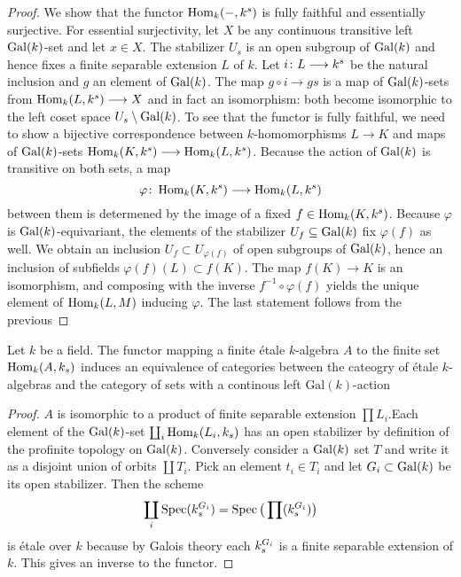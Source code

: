 \begin{proof}
	We show that the functor $\operatorname{Hom}_k(-,k^s)$ is fully faithful and essentially surjective. For essential surjectivity, let $X$ be any continuous transitive left $\operatorname{Gal}(k)$-set and let $x \in X$. The stabilizer $U_s$ is an open subgroup of $\operatorname{Gal}(k)$ and hence fixes a finite separable extension $L$ of $k$. Let $i \colon L \longrightarrow k^s$ be the natural inclusion and $g$ an element of $\operatorname{Gal}(k)$. The map $g \circ i \to gs$ is a map of $\operatorname{Gal}(k)$-sets from $\operatorname{Hom}_k(L,k^s) \longrightarrow X$ and in fact an isomorphism: both become isomorphic to the left coset space $U_s\setminus \operatorname{Gal}(k)$.
	To see that the functor is fully faithful, we need to show a bijective correspondence between $k$-homomorphisms $L \to K$ and maps of $\operatorname{Gal}(k)$-sets $\operatorname{Hom}_k(K, k^s) \longrightarrow \operatorname{Hom}_k(L, k^s)$. Because the action of $\operatorname{Gal}(k)$ is transitive on both sets, a map
	\[
		\varphi \colon \operatorname{Hom}_k(K, k^s) \longrightarrow \operatorname{Hom}_k(L, k^s)
	\]
	between them is determened by the image of a fixed $f \in \operatorname{Hom}_k(K, k^s)$. Because $\varphi$ is $\operatorname{Gal}(k)$-equivariant, the elements of the stabilizer $U_f \subseteq \operatorname{Gal}(k)$ fix $\varphi(f)$ as well. We obtain an inclusion $U_f \subset U_{\varphi(f)}$ of open subgroups of $\operatorname{Gal}(k)$, hence an inclusion of subfields $\varphi(f)(L) \subset f(K)$. The map $f(K) \to K$ is an isomorphism, and composing with the inverse $f^{-1} \circ \varphi(f)$ yields the unique element of $\operatorname{Hom}_k(L,M)$ inducing $\varphi$. The last statement follows from the previous
\end{proof}

\begin{theorem}\label{theorem:galois_grothendieck}
	Let $k$ be a field. The functor mapping a finite \'etale $k$-algebra $A$ to the finite set $\operatorname{Hom}_k(A, k_s)$ induces an equivalence of categories between the cateogry of \'etale $k$-algebras and the category of sets with a continous left $\text{Gal}(k)$-action
\end{theorem}

\begin{proof}
	$A$ is isomorphic to a product of finite separable extension $\prod L_i$.Each element of the $\operatorname{Gal}(k)$-set $\coprod_i \operatorname{Hom}_k(L_i, k_s)$ has an open stabilizer by definition of the profinite topology on $\operatorname{Gal}(k)$. Conversely consider a $\operatorname{Gal}(k)$ set $T$ and write it as a disjoint union of orbits $\coprod T_i$. Pick an element $t_i \in T_i$ and let $G_i \subset \operatorname{Gal}(k)$ be its open stabilizer. Then the scheme
	\[
		\coprod_i \operatorname{Spec}(k_s^{G_i}) = \operatorname{Spec}\big(\prod(k^{G_i}_s)\big)
	\]
	is \'etale over $k$ because by Galois theory each $k_s^{G_i}$ is a finite separable extension of $k$. This gives an inverse to the functor.
\end{proof}\\

